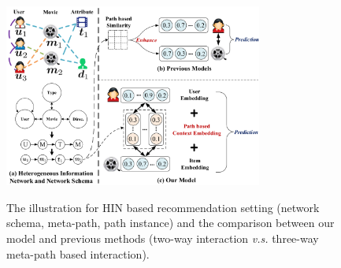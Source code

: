 
\begin{figure}
  \centering
  \includegraphics[width=8.5cm]{image/framework_intro.pdf}\\
  \caption{The illustration for HIN based recommendation setting (network schema, meta-path, path instance) and the comparison between our model and previous methods (two-way interaction \emph{v.s.} three-way meta-path based interaction). }\label{fig-framework-intro}
\end{figure}

